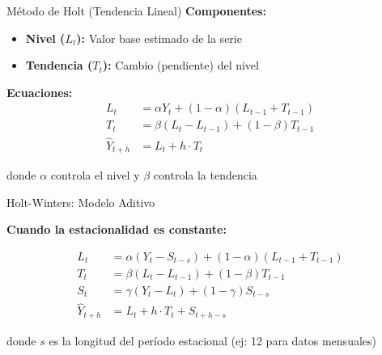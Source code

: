 \documentclass{beamer}
\begin{document}
\begin{frame}{Método de Holt (Tendencia Lineal)}
    \textbf{Componentes:}
    \begin{itemize}
        \item \textbf{Nivel ($L_t$):} Valor base estimado de la serie
        \item \textbf{Tendencia ($T_t$):} Cambio (pendiente) del nivel
    \end{itemize}
    
    \vspace{0.5cm}
    
    \textbf{Ecuaciones:}
    \begin{align*}
    L_t &= \alpha Y_t + (1-\alpha)(L_{t-1} + T_{t-1}) \\
    T_t &= \beta(L_t - L_{t-1}) + (1-\beta)T_{t-1} \\
    \hat{Y}_{t+h} &= L_t + h \cdot T_t
    \end{align*}
    
    donde $\alpha$ controla el nivel y $\beta$ controla la tendencia
\end{frame}

\begin{frame}{Holt-Winters: Modelo Aditivo}
    \begin{center}
        \textbf{Cuando la estacionalidad es constante:}
        
        \vspace{0.3cm}
        
        \small
        \begin{align*}
        L_t &= \alpha (Y_t - S_{t-s}) + (1-\alpha)(L_{t-1} + T_{t-1}) \\
        T_t &= \beta(L_t - L_{t-1}) + (1-\beta)T_{t-1} \\
        S_t &= \gamma(Y_t - L_t) + (1-\gamma)S_{t-s} \\
        \hat{Y}_{t+h} &= L_t + h \cdot T_t + S_{t+h-s}
        \end{align*}
        
        \vspace{0.3cm}
        
        donde $s$ es la longitud del período estacional (ej: 12 para datos mensuales)
    \end{center}
\end{frame}
\end{document}

